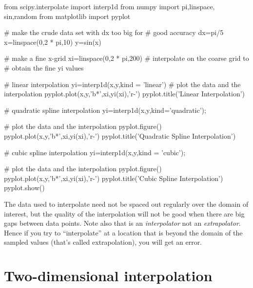 \begin{codeexample}
\begin{VerbatimOut}{\listingFile}
from scipy.interpolate import interp1d
from numpy import pi,linspace, sin,random
from matplotlib import pyplot

# make the crude data set with dx too big for
# good accuracy
dx=pi/5
x=linspace(0,2 * pi,10)
y=sin(x)

# make a fine x-grid
xi=linspace(0,2 * pi,200)
# interpolate on the coarse grid to
# obtain the fine yi values

# linear interpolation
yi=interp1d(x,y,kind = 'linear')
# plot the data and the interpolation
pyplot.plot(x,y,'b*',xi,yi(xi),'r-')
pyplot.title('Linear Interpolation')

# quadratic spline interpolation
yi=interp1d(x,y,kind='quadratic');

# plot the data and the interpolation
pyplot.figure()
pyplot.plot(x,y,'b*',xi,yi(xi),'r-')
pyplot.title('Quadratic Spline Interpolation')

# cubic spline interpolation
yi=interp1d(x,y,kind = 'cubic');

# plot the data and the interpolation
pyplot.figure()
pyplot.plot(x,y,'b*',xi,yi(xi),'r-')
pyplot.title('Cubic Spline Interpolation')
pyplot.show()
\end{VerbatimOut}
\end{codeexample}
The data used to interpolate need not be spaced out regularly over the domain of
interest, but the quality of the interpolation will not be good when
there are big gaps between data points.  Note also that
 is an {\it interpolator} not an {\it extrapolator}.
Hence if you try to ``interpolate'' at a location that is beyond the
domain of the sampled values (that's called extrapolation), you will
get an error.


\section{Two-dimensional interpolation}

